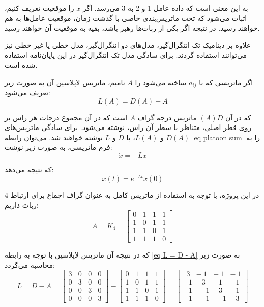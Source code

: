 به این معنی است که داده عامل 1 و 2 به 3 می‌رسد. اگر $x$ را موقعیت تعریف کنیم، اثبات می‌شود که تحت ماتریس‌بندی خاصی با گذشت زمان، موقعیت عامل‌ها به هم خواهند رسید. در نتیجه اگر یکی از ربات‌ها رهبر باشد، بقیه به موقعیت آن خواهند رسید.

علاوه بر دینامیک تک انتگرال‌گیر، مدل‌های دو انتگرال‌گیر، مدل خطی یا غیر خطی نیز می‌توانند استفاده گردند. برای سادگی مدل تک انتگرال‌گیر در این پایان‌نامه استفاده شده است.

 اگر ماتریسی که با $a_{ij}$ ساخته می‌شود را $A$ نامیم، ماتریس لاپلاسین آن به صورت زیر تعریف می‌شود:
\begin{equation}\label{eq L = D - A}
L(A) = D(A) - A
\end{equation}
 
 که در آن $(A)D$ ماتریس درجه گراف $A$ است که در آن مجموع درجات هر راس بر روی قطر اصلی، متناظر با سطر آن راس، نوشته می‌شود.
 برای سادگی ماتریس‌های $D(A)$ و $L(A)$، با $D$ و $L$ نوشته خواهند شد. می‌توان رابطه \ref{eq platoon sum} را به فرم ماتریسی، به صورت زیر نوشت:
\begin{equation}\label{eq x. = -Lx}
	\dot{x} = -Lx
\end{equation}

که نتیجه می‌دهد:
\begin{equation}\label{eq x = elt x}
	x(t) = e^{-Lt}x(0)
\end{equation}

در این پروژه، با توجه به استفاده از ماتریس کامل به عنوان گراف اجماع برای ارتباط 4 ربات داریم:
\begin{equation}
	A = K_4 = 
	\begin{bmatrix}
	0~~~~1~~~~1~~~~1 \\
	1~~~~0~~~~1~~~~1 \\
	1~~~~1~~~~0~~~~1 \\
	1~~~~1~~~~1~~~~0
	\end{bmatrix}
\end{equation}

که در نتیجه آن ماتریس لاپلاسین با توجه به رابطه \ref{eq L = D - A} به صورت زیر محاسبه می‌گردد:
\begin{equation}\label{eq L example}
	L = D - A = 
	\begin{bmatrix}
	3~~~~0~~~~0~~~~0 \\
	0~~~~3~~~~0~~~~0 \\
	0~~~~0~~~~3~~~~0 \\
	0~~~~0~~~~0~~~~3
	\end{bmatrix}
	-
	\begin{bmatrix}
	0~~~~1~~~~1~~~~1 \\
	1~~~~0~~~~1~~~~1 \\
	1~~~~1~~~~0~~~~1 \\
	1~~~~1~~~~1~~~~0
	\end{bmatrix}
	=
	\begin{bmatrix}
	~~3~~~-1~~~-1~~~-1 \\
	-1~~~~~~3~~~-1~~~-1 \\
	-1~~~-1~~~~~~3~~~-1 \\
	-1~~~-1~~~-1~~~~~~3
	\end{bmatrix}
\end{equation}


